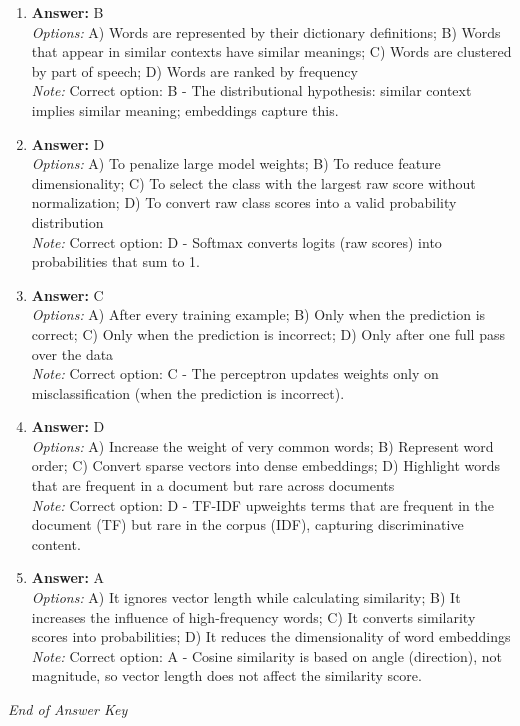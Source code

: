 \documentclass[12pt]{article}
\begin{document}
\begin{enumerate}[label=Q\arabic*.]
\\ \textit{Options:} A) SGD updates weights using the entire dataset every step; B) SGD updates weights using one or a subset of training examples; C) GD converges faster because updates are noisier; D) SGD cannot be used with neural networks
\\ \textit{Note:} Correct option: B - SGD uses one or a mini-batch of examples per update; full-batch GD uses the entire dataset every step.
\item \textbf{Answer:} B
\\ \textit{Options:} A) Words are represented by their dictionary definitions; B) Words that appear in similar contexts have similar meanings; C) Words are clustered by part of speech; D) Words are ranked by frequency
\\ \textit{Note:} Correct option: B - The distributional hypothesis: similar context implies similar meaning; embeddings capture this.
\item \textbf{Answer:} D
\\ \textit{Options:} A) To penalize large model weights; B) To reduce feature dimensionality; C) To select the class with the largest raw score without normalization; D) To convert raw class scores into a valid probability distribution
\\ \textit{Note:} Correct option: D - Softmax converts logits (raw scores) into probabilities that sum to 1.
\item \textbf{Answer:} C
\\ \textit{Options:} A) After every training example; B) Only when the prediction is correct; C) Only when the prediction is incorrect; D) Only after one full pass over the data
\\ \textit{Note:} Correct option: C - The perceptron updates weights only on misclassification (when the prediction is incorrect).
\item \textbf{Answer:} D
\\ \textit{Options:} A) Increase the weight of very common words; B) Represent word order; C) Convert sparse vectors into dense embeddings; D) Highlight words that are frequent in a document but rare across documents
\\ \textit{Note:} Correct option: D - TF-IDF upweights terms that are frequent in the document (TF) but rare in the corpus (IDF), capturing discriminative content.
\item \textbf{Answer:} A
\\ \textit{Options:} A) It ignores vector length while calculating similarity; B) It increases the influence of high-frequency words; C) It converts similarity scores into probabilities; D) It reduces the dimensionality of word embeddings
\\ \textit{Note:} Correct option: A - Cosine similarity is based on angle (direction), not magnitude, so vector length does not affect the similarity score.
\end{enumerate}

\vfill
\noindent\textit{End of Answer Key}
\end{document}
